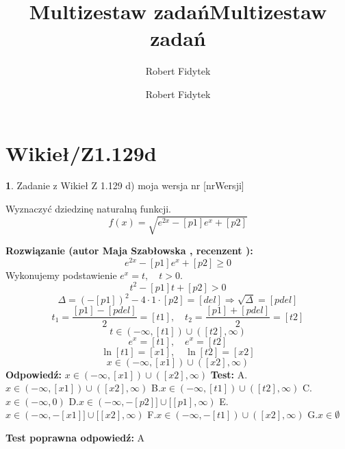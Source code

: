 \documentclass[12pt, a4paper]{article}
\title{Multizestaw zadań}
\author{Robert Fidytek}
\date{}\documentclass[12pt, a4paper]{article}
\title{Multizestaw zadań}
\author{Robert Fidytek}
\date{}
\theoremstyle{definition} %
\newtheorem{zad}{}
\theoremstyle{definition} %
\newtheorem{zad}{}
\newcommand{\kategoria}[1]{\section{#1}} %
\newcommand{\zadStart}[1]{\begin{zad}#1\newline} %
\newcommand{\zadStop}{\end{zad}}   %
\newcommand{\rozwStart}[2]{\noindent \textbf{Rozwiązanie (autor #1 , recenzent #2): }\newline} %
\newcommand{\rozwStop}{\newline}                                            %
\newcommand{\odpStart}{\noindent \textbf{Odpowiedź:}\newline}    %
\newcommand{\odpStop}{\newline}                                             %
\newcommand{\testStart}{\noindent \textbf{Test:}\newline} %
\newcommand{\testStop}{\newline} %
\newcommand{\kluczStart}{\noindent \textbf{Test poprawna odpowiedź:}\newline} %
\newcommand{\kluczStop}{\newline} %
\begin{document}
\maketitle


\kategoria{Wikieł/Z1.129d}
\zadStart{Zadanie z Wikieł Z 1.129 d) moja wersja nr [nrWersji]}

Wyznaczyć dziedzinę naturalną funkcji.
$$f(x)=\sqrt{e^{2x}-[p1]e^{x}+[p2]}$$

\zadStop

\rozwStart{Maja Szabłowska}{}
$$e^{2x}-[p1]e^{x}+[p2]\geq 0$$
Wykonujemy podstawienie $e^{x}=t,\quad t>0.$
$$t^{2}-[p1]t+[p2]>0$$
$$\Delta=(-[p1])^{2}-4\cdot1\cdot[p2]=[del] \Rightarrow \sqrt{\Delta}=[pdel]$$
$$t_{1}=\frac{[p1]-[pdel]}{2}=[t1], \quad t_{2}=\frac{[p1]+[pdel]}{2}=[t2]$$
$$t\in(-\infty,[t1])\cup([t2],\infty)$$
$$e^{x}=[t1], \quad e^{x}=[t2]$$
$$\ln[t1]=[x1], \quad \ln[t2]=[x2]$$
$$x\in(-\infty,[x1])\cup([x2],\infty)$$
\rozwStop
\odpStart
$x\in(-\infty,[x1])\cup([x2],\infty)$
\odpStop
\testStart
A.$x\in(-\infty,[x1])\cup([x2],\infty)$
B.$x\in(-\infty,[t1])\cup([t2],\infty)$
C.$x\in(-\infty, 0)$
D.$x\in(-\infty, -[p2]] \cup [[p1],\infty)$
E.$x\in(-\infty, -[x1]] \cup [[x2],\infty)$
F.$x\in(-\infty, -[t1]) \cup ([x2],\infty)$
G.$x\in\emptyset$

\testStop
\kluczStart
A
\kluczStop
\end{document}
